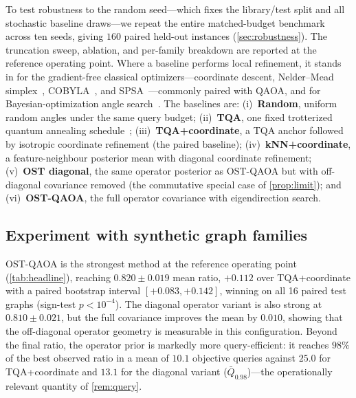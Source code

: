 \documentclass[aps,prresearch,reprint,amsmath,amssymb,floatfix,nofootinbib,superscriptaddress,longbibliography]{revtex4-2}
\theoremstyle{remark}
\newcommand{\OSTQAOA}{\textnormal{\textsc{OST-QAOA}}}
\newcommand{\TQA}{\textnormal{\textsc{TQA}}}
\begin{document}
To test robustness to the random seed---which fixes the library/test split and
all stochastic baseline draws---we repeat the entire matched-budget benchmark
across ten seeds, giving \(160\) paired held-out instances (\cref{sec:robustness}).
The truncation sweep, ablation, and per-family breakdown are reported at the
reference operating point.  Where a baseline performs local refinement, it stands
in for the gradient-free classical optimizers---coordinate descent, Nelder--Mead
simplex~\cite{neldermead1965}, COBYLA~\cite{powell1994}, and SPSA~\cite{spall1992}---commonly
paired with QAOA, and for Bayesian-optimization angle search~\cite{tibaldi2023}.
The baselines are:
(i)~\textbf{Random}, uniform random angles under the same query budget;
(ii)~\textbf{\TQA{}}, one fixed trotterized quantum annealing
schedule~\cite{sack2021};
(iii)~\textbf{\TQA{}+coordinate}, a \TQA{} anchor followed by isotropic
coordinate refinement (the paired baseline);
(iv)~\textbf{kNN+coordinate}, a feature-neighbour posterior mean with diagonal
coordinate refinement;
(v)~\textbf{OST diagonal}, the same operator posterior as \OSTQAOA{} but with
off-diagonal covariance removed (the commutative special case of
\cref{prop:limit}); and
(vi)~\textbf{\OSTQAOA{}}, the full operator covariance with eigendirection search.

\subsection{Experiment with synthetic graph families}
\label{sec:synthetic}

\OSTQAOA{} is the strongest method at the reference operating point
(\cref{tab:headline}), reaching \(0.820\pm0.019\) mean ratio, \(+0.112\) over
\TQA{}+coordinate with a paired bootstrap interval \([+0.083,+0.142]\), winning on
all 16 paired test graphs (sign-test \(p<10^{-4}\)).  The diagonal operator
variant is also strong at \(0.810\pm0.021\), but the full covariance improves the
mean by \(0.010\), showing that the off-diagonal operator geometry is measurable
in this configuration.  Beyond the final ratio, the operator prior is markedly
more query-efficient: it reaches \(98\%\) of the best observed ratio in a mean of
\(10.1\) objective queries against \(25.0\) for \TQA{}+coordinate and \(13.1\) for
the diagonal variant (\(\bar Q_{0.98}\))---the operationally relevant quantity of
\cref{rem:query}.

\begin{table}[t]
\centering
\caption{Approximation ratio and query cost of the angle-search task with
\OSTQAOA{} and the baselines at the reference operating point (\(p=3\), \(Q=24\),
rank \(4\), seed \(260424803\)).  Values are mean approximation ratio with 95\%
confidence intervals across 16 held-out graphs.  \(\Delta\) is the paired
difference against \TQA{}+coordinate with a bootstrap 95\% interval; \(\bar
Q_{0.98}\) is the mean number of objective queries to reach \(98\%\) of the best
observed ratio (\cref{rem:query}).}
\label{tab:headline}

\end{table}
\end{document}
